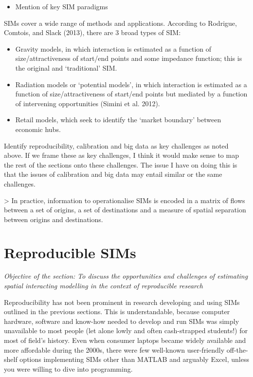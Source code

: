 \documentclass[11pt,letterpaper]{article}
\providecommand{\tightlist}{%
  \setlength{\itemsep}{0pt}\setlength{\parskip}{0pt}}
\begin{document}
\begin{itemize}
\tightlist
\item
  Mention of key SIM paradigms
\end{itemize}

SIMs cover a wide range of methods and applications.
According to Rodrigue, Comtois, and Slack (2013), there are 3 broad types of SIM:

\begin{itemize}
\item
  Gravity models, in which interaction is estimated as a function of size/attractiveness of start/end points and some impedance function; this is the original and `traditional' SIM.
\item
  Radiation models or `potential models', in which interaction is estimated as a function of size/attractiveness of start/end points but mediated by a function of intervening opportunities (Simini et al. 2012).
\item
  Retail models, which seek to identify the `market boundary' between economic hubs.
\end{itemize}

Identify reproducibility, calibration and big data as key challenges as noted above.
If we frame these as key challenges, I think it would make sense to map the rest of the sections onto these challenges.
The issue I have on doing this is that the issues of calibration and big data may entail similar or the same challenges.

\textgreater{} In practice, information to operationalise SIMs is encoded in a matrix of flows between a set of origins, a set of destinations and a measure of spatial separation between origins and destinations.

\hypertarget{reproducible-sims}{%
\section{\texorpdfstring{Reproducible SIMs }{Reproducible SIMs }}\label{reproducible-sims}}

\emph{Objective of the section: To discuss the opportunities and challenges of estimating spatial interacting modelling in the context of reproducible research}

Reproducibility has not been prominent in research developing and using SIMs outlined in the previous sections.
This is understandable, because computer hardware, software and know-how needed to develop and run SIMs was simply unavailable to most people (let alone lowly and often cash-strapped students!) for most of field's history.
Even when consumer laptops became widely available and more affordable during the 2000s, there were few well-known user-friendly off-the-shelf options implementing SIMs other than MATLAB and arguably Excel, unless you were willing to dive into programming.
\end{document}

